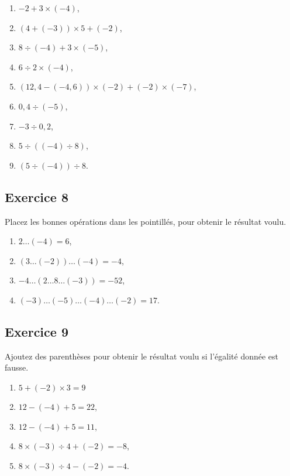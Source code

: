 \documentclass[12 pt]{extarticle}
\theoremstyle{plain}
\begin{document}
\begin{enumerate}
\item $-2 + 3 \times (-4)$, 
\item $ (4 + (-3)) \times 5 + (-2)$,
\item $ 8 \div(-4) + 3 \times (-5)$, 
\item $ 6 \div 2 \times (-4)$, 
\item $(12,4 - (-4,6)) \times (-2) + (-2) \times (-7) $, 
\item $ 0,4 \div (-5)$, 
\item $ - 3 \div 0,2$, 
\item $ 5 \div ((-4) \div 8)$,
\item $ (5 \div (-4) )\div 8$.


\end{enumerate}

\subsection*{Exercice 8}

Placez les bonnes opérations dans les pointillés, pour obtenir le résultat voulu. 

\begin{enumerate}
\item $2 \ldots (-4) = 6$, 
\item $(3 \ldots (-2) ) \ldots (-4) = -4$, 
\item $ -4 \ldots(  2 \ldots 8 \ldots (-3) )= -52$, 
\item $ (- 3) \ldots (- 5) \ldots (-4) \ldots (-2) = 17$.
\end{enumerate}

\subsection*{Exercice 9}

Ajoutez des parenthèses pour obtenir le résultat voulu si l'égalité donnée est fausse. 
\begin{enumerate}
\item $5 + (-2) \times 3 = 9$ 
\item $12 - (-4) + 5 = 22$, 
\item $12 - (-4) + 5 = 11$, 
\item $8 \times (-3) \div 4 + (-2) = - 8$,
\item $8 \times (-3) \div 4 - (-2) = -4 $. 
\end{enumerate}

 	
\end{document}
